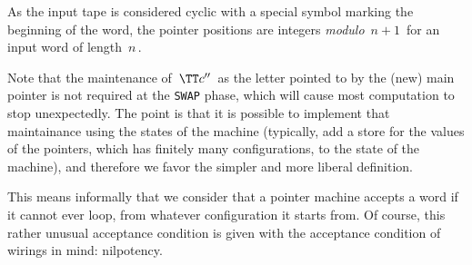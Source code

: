 \smallskip
As the input tape is considered cyclic with a special symbol marking the beginning of the word, the pointer positions are integers \emph{modulo} $\,n+1\,$ for an input word of length $\,n\,$.


Note that the maintenance of $\,\TT c''\,$ as the letter pointed to by the (new) main pointer is not required at the \texttt{SWAP} phase, which will cause most computation to stop unexpectedly. The point is that it is possible to implement that maintainance using the states of the machine (typically, add a store for the values of the pointers, which has finitely many configurations, to the state of the machine), and therefore we favor the simpler and more liberal definition.


This means informally that we consider that a pointer machine accepts a word if it cannot ever loop, from whatever configuration it starts from. Of course, this rather unusual acceptance condition is given with the acceptance condition of wirings in mind: nilpotency.

